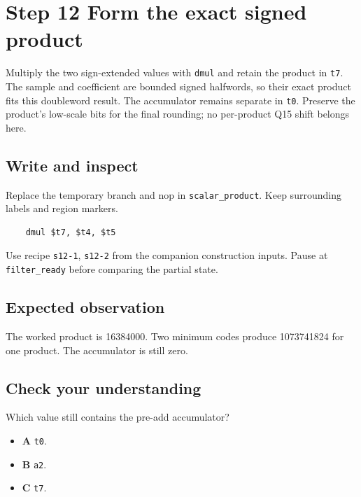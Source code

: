 \section{Step 12 Form the exact signed product}\label{fir-s12}

Multiply the two sign-extended values with \texttt{dmul} and retain the product in \texttt{t7}. The sample and coefficient are bounded signed halfwords, so their exact product fits this doubleword result. The accumulator remains separate in \texttt{t0}. Preserve the product’s low-scale bits for the final rounding; no per-product Q15 shift belongs here.

\subsection{Write and inspect}
Replace the temporary branch and nop in \texttt{scalar\_product}. Keep surrounding labels and region markers.

\begin{verbatim}
    dmul $t7, $t4, $t5
\end{verbatim}
Use recipe \texttt{s12-1}, \texttt{s12-2} from the companion construction inputs. Pause at \texttt{filter\_ready} before comparing the partial state.

\subsection{Expected observation}
The worked product is 16384000. Two minimum codes produce 1073741824 for one product. The accumulator is still zero.

\subsection{Check your understanding}
Which value still contains the pre-add accumulator?

\begin{itemize}
  \item \textbf{A} \texttt{t0}.
  \item \textbf{B} \texttt{a2}.
  \item \textbf{C} \texttt{t7}.
\end{itemize}

